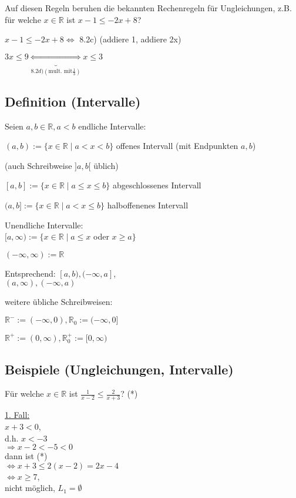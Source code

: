 \documentclass[a4paper, 12pt, twoside] {article}
\begin{document}
Auf diesen Regeln beruhen die bekannten Rechenregeln für Ungleichungen, z.B. für welche $x \in \mathbb{R}$ ist
$x - 1 \leq -2x + 8$?

$x - 1 \leq -2x + 8 \Leftrightarrow$ 8.2c) (addiere 1, addiere 2x)

$3x \leq 9 \underbrace{\Leftrightarrow}_{8.2d) (\text{mult. mit} \frac{1}{3})} x \leq 3$

\subsection{Definition (Intervalle)} %

Seien $a, b \in \mathbb{R}, a < b$ endliche Intervalle:

$(a, b) := \{x \in \mathbb{R} \mid a < x < b\}$ offenes Intervall (mit Endpunkten $a, b$)

(auch Schreibweise $]a, b[$ üblich)

$[a, b] := \{x \in \mathbb{R} \mid a \leq x \leq b \}$ abgeschlossenes Intervall

$(a, b] := \{x \in \mathbb{R} \mid a < x \leq b \}$ halboffenenes Intervall

Unendliche Intervalle: \\
$[a, \infty) := \{x \in \mathbb{R} \mid a \leq x$ oder $x \geq a \}$

$(-\infty, \infty) := \mathbb{R}$

Entsprechend: $[a, b), (-\infty, a]$, \\
$(a, \infty), (-\infty, a)$

weitere übliche Schreibweisen:

$\mathbb{R}^- := (-\infty, 0), \mathbb{R}^{}_{0} := (-\infty, 0]$

$\mathbb{R}^+ := (0, \infty), \mathbb{R}^{+}_{0} := [0, \infty)$

\subsection{Beispiele (Ungleichungen, Intervalle)} %

Für welche $x \in \mathbb{R}$ ist $\frac{1}{x-2} \leq \frac{2}{x+3}$? (*)

\underline{1. Fall:} \\
$x + 3 < 0$, \\
d.h. $x < -3$ \\
$\Rightarrow x -2 < -5 < 0$ \\
dann ist (*) \\
$\Leftrightarrow x + 3 \leq 2 (x-2) = 2x-4$ \\
$\Leftrightarrow x \geq 7$, \\
nicht möglich, $L_1 = \emptyset$
\end{document}
